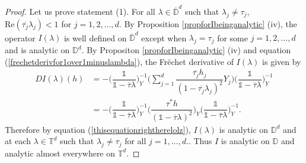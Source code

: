 \documentclass[11pt, reqno]{amsart}
\newcommand\1{\boldsymbol {1}}
\numberwithin{equation}{section}
\begin{document}
\begin{proof}
    Let us prove statement (1). For all $\lambda\in\overline{\mathbb{D}}^{d}$ such that $\lambda_{j}\neq \tau_{j}$, $\mathrm{Re}(\overline{\tau_{j}}\lambda_{j})<1$ for $j=1,2,\hdots,d$. By Proposition \ref{propforIbeinganalytic} (iv), the operator $I(\lambda)$ is well defined on $\overline{\mathbb{D}}^{d}$ except when $\lambda_{j}=\tau_{j}$ for some $j=1,2,\hdots,d$ and is analytic on $\mathbb{D}^{d}$. By Propositon \ref{propforIbeinganalytic} (iv) and equation (\ref{frechetderivfor1over1minuslambda}), the Fr\"{e}chet derivative of $I(\lambda)$ is given by   
  \begin{align}
    DI(\lambda)(h) &= -\bigg(\dfrac{\mathds{1}}{\mathds{1}-\overline{\tau}\lambda}\bigg)^{-1}_{Y}\bigg(\sum_{j=1}^{d}\dfrac{\overline{\tau_{j}}h_{j}}{(1-\overline{\tau_{j}}\lambda_{j})^{2}}Y_{j}\bigg)\bigg(\dfrac{\mathds{1}}{\mathds{1}-\overline{\tau}\lambda}\bigg)^{-1}_{Y}\nonumber \\
    &= -\bigg(\dfrac{\mathds{1}}{\mathds{1}-\overline{\tau}\lambda}\bigg)^{-1}_{Y}\bigg(\dfrac{{\tau}^{*}h}{(\mathds{1}-\overline{\tau}\lambda)^{2}}\bigg)_{Y}\bigg(\dfrac{\mathds{1}}{\mathds{1}-\overline{\tau}\lambda}\bigg)^{-1}_{Y}.\label{thisequationrightherelolz}
\end{align}
Therefore by equation (\ref{thisequationrightherelolz}), $I(\lambda)$ is analytic on $\mathbb{D}^{d}$ and at each $\lambda\in\mathbb{T}^{d}$ such that $\lambda_{j} \neq \tau_{j}$ for all $j=1,\hdots,d.$. Thus $I$ is analytic on $\mathbb{D}$ and analytic almost everywhere on $\mathbb{T}^{d}$. 


\end{proof}
\end{document}
